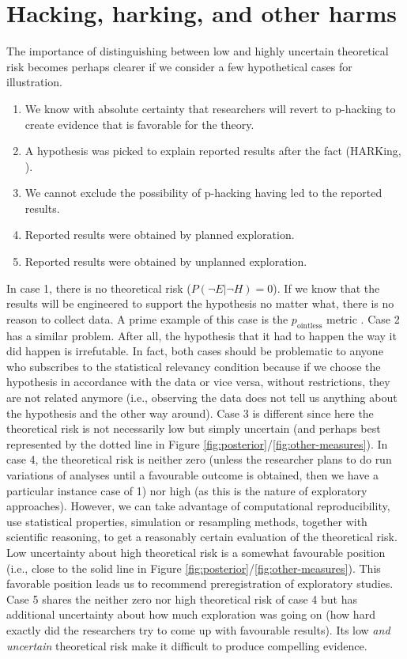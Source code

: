 \documentclass[jou,a4paper]{apa7}
\begin{document}
\section{Hacking, harking, and other harms} 

The importance of distinguishing between low and highly uncertain theoretical risk becomes perhaps clearer if we consider a few hypothetical cases for illustration.

\begin{enumerate}
    \item We know with absolute certainty that researchers will revert to p-hacking to create evidence that is favorable for the theory.
    \item A hypothesis was picked to explain reported results after the fact (HARKing, \cite{kerrHARKingHypothesizingResults1998}).
    \item  We cannot exclude the possibility of p-hacking having led to the reported results.
    \item Reported results were obtained by planned exploration.
   \item Reported results were obtained by unplanned exploration.
\end{enumerate}

In case 1, there is no theoretical risk ($P(\neg{}E|\neg{}H) = 0$).
If we know that the results will be engineered to support the hypothesis no matter what, there is no reason to collect data.
A prime example of this case is the $p_\text{ointless}$ metric \parencite{husseyMethodStreamlinePhacking2021}.
Case 2 has a similar problem.
After all, the hypothesis that it had to happen the way it did happen is irrefutable.
In fact, both cases should be problematic to anyone who subscribes to the statistical relevancy condition because if we choose the hypothesis in accordance with the data or vice versa, without restrictions, they are not related anymore (i.e., observing the data does not tell us anything about the hypothesis and the other way around).
Case 3 is different since here the theoretical risk is not necessarily low but simply uncertain (and perhaps best represented by the dotted line in Figure \ref{fig:posterior}/\ref{fig:other-measures}).
In case 4, the theoretical risk is neither zero (unless the researcher plans to do run variations of analyses until a favourable outcome is obtained, then we have a particular instance case of 1) nor high (as this is the nature of exploratory approaches).
However, we can take advantage of computational reproducibility, use statistical properties, simulation or resampling methods, together with scientific reasoning, to get a reasonably certain evaluation of the theoretical risk.
Low uncertainty about high theoretical risk is a somewhat favourable position (i.e., close to the solid line in Figure \ref{fig:posterior}/\ref{fig:other-measures}).
This favorable position leads us to recommend preregistration of exploratory studies.
Case 5 shares the neither zero nor high theoretical risk of case 4 but has additional uncertainty about how much exploration was going on (how hard exactly did the researchers try to come up with favourable results).
Its low \textit{and uncertain} theoretical risk make it difficult to produce compelling evidence.
\end{document}
